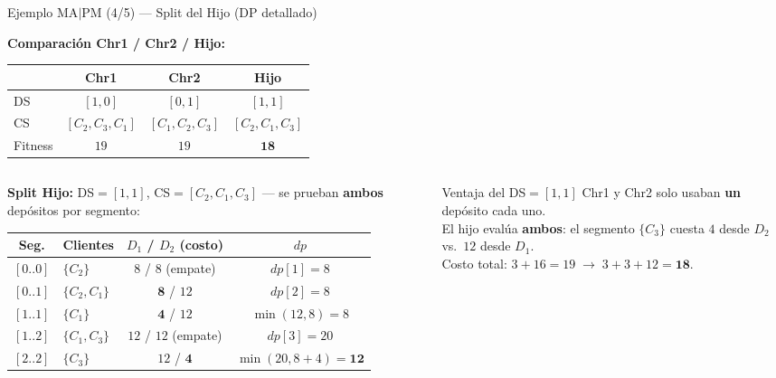 \documentclass[aspectratio=169,10pt]{beamer}
\begin{document}
\begin{frame}{Ejemplo MA$|$PM (4/5) --- Split del Hijo (DP detallado)}

  \textbf{Comparación Chr1 / Chr2 / Hijo:}
  \vspace{0.1em}
  \begin{center}\footnotesize
  \begin{tabular}{lccc}
    \toprule
    & Chr1 & Chr2 & Hijo \\
    \midrule
    DS      & $[1,0]$         & $[0,1]$         & $[1,1]$ \\
    CS      & $[C_2,C_3,C_1]$ & $[C_1,C_2,C_3]$ & $[C_2,C_1,C_3]$ \\
    Fitness & $19$            & $19$            & $\mathbf{18}$ \\
    \bottomrule
  \end{tabular}
  \end{center}

  \vspace{0.2em}
  \begin{columns}[T,onlytextwidth]
    \begin{column}{0.55\textwidth}
      \textbf{Split Hijo:} DS$=[1,1]$, CS$=[C_2,C_1,C_3]$ — se prueban \textbf{ambos} depósitos por segmento:
      \vspace{0.15em}
      \begin{center}\footnotesize
      \begin{tabular}{clcc}
        \toprule
        Seg. & Clientes & $D_1$ / $D_2$ (costo) & $dp$ \\
        \midrule
        $[0..0]$ & $\{C_2\}$     & $8$ / $8$ (empate)          & $dp[1]=8$ \\
        $[0..1]$ & $\{C_2,C_1\}$ & $\mathbf{8}$ / $12$         & $dp[2]=8$ \\
        $[1..1]$ & $\{C_1\}$     & $\mathbf{4}$ / $12$         & $\min(12,8)=8$ \\
        $[1..2]$ & $\{C_1,C_3\}$ & $12$ / $12$ (empate)        & $dp[3]=20$ \\
        $[2..2]$ & $\{C_3\}$     & $12$ / $\mathbf{4}$         & $\min(20,8{+}4)=\mathbf{12}$ \\
        \bottomrule
      \end{tabular}
      \end{center}
    \end{column}
    \begin{column}{0.43\textwidth}
      \begin{block}{Ventaja del DS$=[1,1]$}\footnotesize
        Chr1 y Chr2 solo usaban \textbf{un} depósito cada uno.\\[0.2em]
        El hijo evalúa \textbf{ambos}: el segmento $\{C_3\}$ cuesta $4$ desde $D_2$ vs.\ $12$ desde $D_1$.\\[0.2em]
        Costo total: $3{+}16=19 \;\to\; 3{+}3{+}12=\mathbf{18}$.
      \end{block}
    \end{column}
  \end{columns}
\end{frame}
\end{document}
